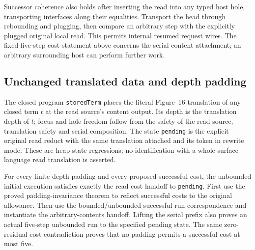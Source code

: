 

Successor coherence also holds after inserting the read into any typed
host hole, transporting interfaces along their equalities. Transport the
head through rebounding and plugging, then compare an arbitrary step with
the explicitly plugged original local read. This permits internal resumed
request wires. The fixed five-step cost statement above concerns the serial
content attachment; an arbitrary surrounding host can perform further work.


\subsection{Unchanged translated data and depth padding}

The closed program \texttt{storedTerm} places the literal Figure~16
translation of any closed term $t$ at the read source's content output.
Its depth is the translation depth of $t$; focus and hole freedom follow
from the safety of the read source, translation safety and serial composition.
The state \texttt{pending} is the explicit original read reduct with the
same translation attached and its token in rewrite mode. These are heap-state
regressions; no identification with a whole surface-language read translation
is asserted.



For every finite depth padding and every proposed successful cost, the
unbounded initial execution satisfies exactly the read cost handoff to
\texttt{pending}. First use the proved padding-invariance theorem to reflect
successful costs to the original allowance. Then use the bounded/unbounded
successful-run correspondence and instantiate the arbitrary-contents handoff.
Lifting the serial prefix also proves an actual five-step unbounded run to
the specified pending state. The same zero-residual-cost contradiction proves
that no padding permits a successful cost at most five.


